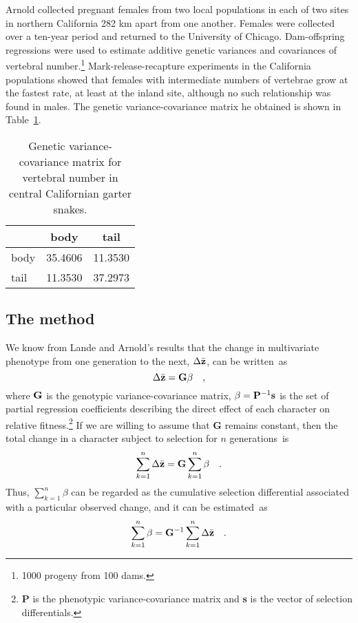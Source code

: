 Arnold collected pregnant females from two local populations in each
of two sites in northern California 282 km apart from one
another. Females were collected over a ten-year period and returned to
the University of Chicago. Dam-offspring regressions were used to
estimate additive genetic variances and covariances of vertebral
number.\footnote{1000 progeny from 100 dams.}  Mark-release-recapture
experiments in the California populations showed that females with
intermediate numbers of vertebrae grow at the fastest rate, at least
at the inland site, although no such relationship was found in
males. The genetic variance-covariance matrix he obtained is shown in
Table~\ref{table:arnold-data}.

\begin{table}
\begin{center}
\begin{tabular}{l|cc}
\hline\hline
     & body    & tail \\
\hline
body & 35.4606 & 11.3530 \\
tail & 11.3530 & 37.2973 \\
\hline
\end{tabular}
\end{center}
\caption{Genetic variance-covariance matrix for vertebral number in
central Californian garter snakes.}\label{table:arnold-data}
\end{table}

\subsection*{The method}

We know from Lande and Arnold's results that the change in
multivariate phenotype from one generation to the next,
$\Delta\bar{\bf z}$, can be written~as
\[
\Delta\bar{\bf z} = {\bf G\beta} \quad ,
\]
where $\bf G$ is the genotypic variance-covariance matrix, ${\bf\beta}
= {\bf P}^{-1}{\bf s}$ is the set of partial regression coefficients
describing the direct effect of each character on relative
fitness.\footnote{{\bf P} is the phenotypic variance-covariance matrix
and {\bf s} is the vector of selection differentials.} If we are
willing to assume that {\bf G} remains constant, then the total change
in a character subject to selection for $n$ generations~is
\[
\sum_{k=1}^n \Delta\bar{\bf z} = {\bf G}\sum_{k=1}^n\beta \quad .
\]
Thus, $\sum_{k=1}^n\beta$ can be regarded as the cumulative selection
differential associated with a particular observed change, and it can
be estimated~as
\[
\sum_{k=1}^n\beta = {\bf G}^{-1}\sum_{k=1}^n \Delta\bar{\bf z}\quad .
\]

